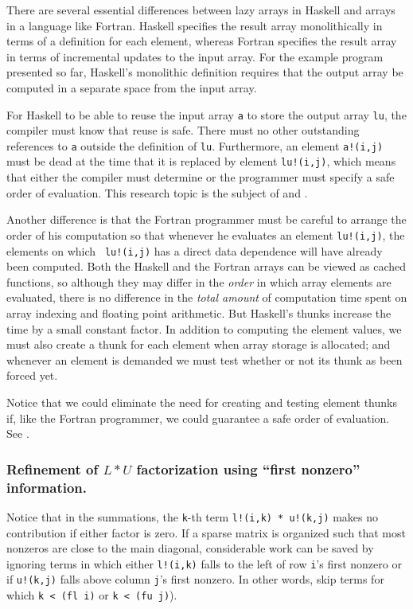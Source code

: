 There are several essential differences between lazy arrays in Haskell
and arrays in a language like Fortran.  Haskell specifies the result
array monolithically in terms of a definition for each element,
whereas Fortran specifies the result array in terms of incremental
updates to the input array.  For the example program presented so far,
Haskell's monolithic definition requires that the output array be
computed in a separate space from the input array.

For Haskell to be able to reuse the input array {\tt a} to store the
output array {\tt lu}, the compiler must know that reuse is safe.
There must no other outstanding references to {\tt a} outside the
definition of {\tt lu}.  Furthermore, an element {\tt a!(i,j)} must
be dead at the time that it is replaced by element {\tt lu!(i,j)},
which means that either the compiler must determine or the programmer
must specify a safe order of evaluation.  This research topic is 
the subject of \cite{ande89} and \cite{ande89b}.

Another difference is that the Fortran programmer must be careful to
arrange the order of his computation so that whenever
he evaluates an element {\tt lu!(i,j)}, the elements on which {\tt  
lu!(i,j)}
has a direct data dependence will have already been computed.
Both the Haskell and the Fortran arrays can be viewed as cached
functions, so although they may differ in the {\em order} in which
array elements are evaluated, there is no difference in the {\em total
amount} of computation time spent on array indexing and floating point
arithmetic.  But Haskell's thunks increase the time by a small constant
factor. In addition to computing the element values, we must also create
a thunk for each element when array storage is allocated; and whenever
an element is demanded we must test whether or not its thunk as been
forced yet.

Notice that we could eliminate the need for creating and testing element
thunks if, like the Fortran programmer, we could guarantee a safe order
of evaluation.  See \cite{ande89,ande89b}.


\subsubsection{Refinement of $L*U$ factorization using ``first
               nonzero'' information.}

Notice that in the summations, the {\tt k}-th term {\tt l!(i,k) * u!(k,j)}
makes no contribution if either factor is zero.  If a sparse matrix
is organized such that most nonzeros are close to the main diagonal,
considerable work can be saved by ignoring terms in which
either {\tt l!(i,k)} falls to the left of row {\tt i}'s first nonzero
or if {\tt u!(k,j)} falls above column {\tt j}'s first nonzero.
In other words, skip terms for which {\tt k < (fl i)} or {\tt k < (fu  
j)}).

